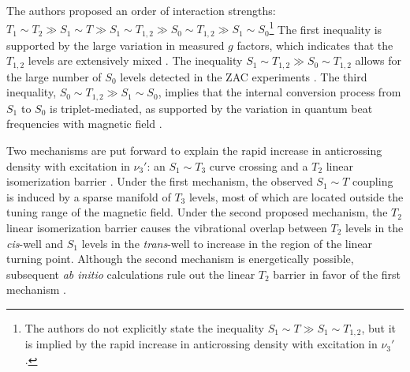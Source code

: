 The authors proposed an order of interaction strengths: $T_1 \sim T_2
\gg S_1 \sim T \gg S_1 \sim T_{1,2} \gg S_0 \sim T_{1,2} \gg S_1 \sim
S_0$\footnote{The authors do not explicitly state the inequality $S_1
  \sim T \gg S_1 \sim T_{1,2}$, but it is implied by the rapid
  increase in anticrossing density with excitation in $\nu_3'$.}
\cite{dupre95b} The first inequality is supported by the large
variation in measured $g$ factors, which indicates that the $T_{1,2}$
levels are extensively mixed \cite{dupre95a}.  The inequality $S_1
\sim T_{1,2} \gg S_0 \sim T_{1,2}$ allows for the large number of
$S_0$ levels detected in the ZAC experiments \cite{dupre91}.  The
third inequality, $S_0 \sim T_{1,2} \gg S_1 \sim S_0$, implies that
the internal conversion process from $S_1$ to $S_0$ is
triplet-mediated, as supported by the variation in quantum beat
frequencies with magnetic field \cite{dupre95a}.

Two mechanisms are put forward to explain the rapid increase in
anticrossing density with excitation in $\nu_3'$: an $S_1 \sim T_3$
curve crossing and a $T_2$ linear isomerization barrier \cite{dupre91,
  dupre95b}.  Under the first mechanism, the observed $S_1 \sim T$
coupling is induced by a sparse manifold of $T_3$ levels, most of
which are located outside the tuning range of the magnetic field.
Under the second proposed mechanism, the $T_2$ linear isomerization
barrier causes the vibrational overlap between $T_2$ levels in the
\emph{cis}-well and $S_1$ levels in the \emph{trans}-well to increase
in the region of the linear turning point.  Although the second
mechanism is energetically possible, subsequent \emph{ab initio}
calculations rule out the linear $T_2$ barrier in favor of the first
mechanism \cite{vacek96, sherrill96, cui96, cui97, ventura03}.




